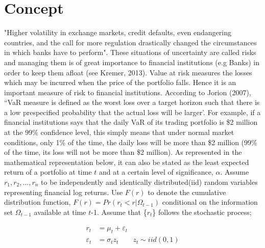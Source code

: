 \documentclass[a4paper,11pt,oneside]{book}
\begin{document}

\section{Concept}
"Higher volatility in exchange markets, credit defaults, even endangering countries, and the call for more regulation drastically changed the circumstances in which banks have to perform". These situations of uncertainty are called risks and managing them is of great importance to financial institutions (e.g Banks) in order to keep them afloat (see Kremer, 2013). Value at risk measures the losses which may be incurred when the price of the portfolio falls. Hence it is an important measure of risk to financial institutions.
\newline\newline
According to Jorion (2007), “VaR measure is defined as the worst loss over a target horizon such that there is a low prespecified probability that the actual loss will be larger'. For example, if a financial institutions says that
the daily VaR of its trading portfolio is \$2 million at the 99\%
confidence level, this simply means that under normal market conditions,
only 1\% of the time, the daily loss will be more than \$2 million (99\% of the time, its loss will not be more than \$2 million). As represented in the mathematical representation below, it can also be stated as the least expected return of a portfolio at time $t$ and at a certain level of significance, $\alpha$.
\newline\newline
Assume $r_1, r_2, ..., r_n$ to be independently and identically distributed(iid) random variables representing financial log returns. Use $F(r)$ to denote the cumulative distribution function,
$F(r) = Pr(r_{t} < r|\Omega_{t-1})$ conditional on the information set $\Omega_{t-1}$ available at time $t$-1. Assume that \{$r_t$\} follows the stochastic process; \newline

\begin{equation}
\begin{aligned}
r_t &= \mu_t + \varepsilon_t
\\
\varepsilon_t &= \sigma_t  z_t \qquad   z_t \sim iid(0,1)
\label{1}
\end{aligned}
\end{equation}
\end{document}
